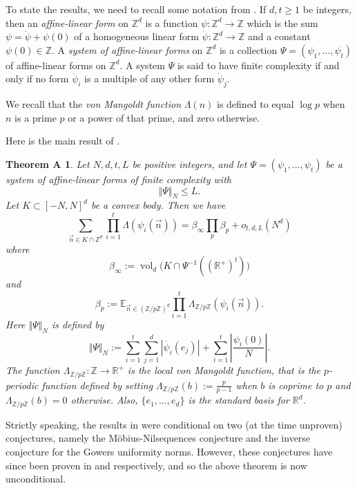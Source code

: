 \documentclass[11pt]{amsart}
\numberwithin{equation}{section}  %
\theoremstyle{remark}
\theoremstyle{plain}
\newtheorem*{gt-maintheorem}{Theorem A \cite[Main Theorem]{gt-linearprimes}}
\numberwithin{equation}{section}
\newcommand{\Z}{\mathbb{Z}}
\newcommand{\R}{\mathbb{R}}
\newcommand{\E}{\mathbb{E}}  %
\renewcommand{\leq}{\leqslant}
\renewcommand{\geq}{\geqslant}
\renewcommand{\(}{\left(}
\renewcommand{\)}{\right)}
\newcommand{\vect}[1]{{\ensuremath{\vec{#1}}}}
\newcommand{\vol}{\operatorname{vol}}
\begin{document}
To state the results, we need to recall some notation from \cite{gt-linearprimes}.  If $d,t \geq 1$ be integers, then an \emph{affine-linear form} on $\Z^d$ is a function $\psi: \Z^d \to \Z$ which is the sum $\psi = \dot \psi + \psi(0)$ of a homogeneous linear form $\dot \psi: \Z^d \to \Z$ and a constant $\psi(0) \in \Z$.  A \emph{system of affine-linear forms} on $\Z^d$ is a collection $\Psi = (\psi_1,\ldots,\psi_t)$ of affine-linear forms on $\Z^d$. 
A system $\Psi$ is said to have finite complexity if and only if no form $\dot\psi_i$ is a multiple of any other form $\dot\psi_j$. 


We recall that the \emph{von Mangoldt function} $\Lambda(n)$ is defined to equal $\log p$ when $n$ is a prime $p$ or a power of that prime, and zero otherwise.

Here is the main result of \cite{gt-linearprimes}.

\begin{gt-maintheorem}
  Let $N, d, t, L$ be positive integers, and let $\Psi = (\psi_1,\ldots,\psi_t)$ be a system of affine-linear forms of finite complexity with 
\begin{equation}\label{size-assumption}\Vert \Psi \Vert_N \leq L.  \end{equation}
Let $K \subset [-N,N]^d$ be a convex body.  Then we have
\begin{equation}\label{dickson-eq}
\sum_{ \vect{n} \in K \cap \Z^d} \prod_{i=1}^t \Lambda( \psi_i( \vect{n}) ) = \beta_\infty \prod_p \beta_p + o_{t,d,L}(N^d)
\end{equation}
where 
\[ \beta_{\infty} := \vol_d\big( K \cap \Psi^{-1}((\R^+)^t) \big)\]
and
\[ \beta_p := \E_{\vect{n} \in (\Z/p\Z)^d} \prod_{i=1}^t \Lambda_{\Z/p\Z}(\psi_i(\vect{n})).\]
Here $\Vert \Psi \Vert_N$ is defined by
\[ \Vert \Psi \Vert_N := \sum_{i=1}^t \sum_{j = 1}^d |\dot{\psi_i}(e_j)|  + \sum_{i = 1}^t \left|\frac{\psi_i(0)}{N}\right|.\]
The function $\Lambda_{\Z/p\Z}: \Z \to \R^+$ is the \emph{local von Mangoldt function}, that is the $p$-periodic function defined by setting $\Lambda_{\Z/p\Z}(b) := \frac{p}{p-1}$ when $b$ is coprime to $p$ and $\Lambda_{\Z/p\Z}(b) = 0$ otherwise.  Also, $\{e_1,\ldots,e_d\}$ is the standard basis for $\R^d$.
\end{gt-maintheorem}

Strictly speaking, the results in \cite{gt-linearprimes} were conditional on two (at the time unproven) conjectures, namely the M\"obius-Nilsequences conjecture and the inverse conjecture for the Gowers uniformity norms.  However, these conjectures have since been proven in \cite{gt-nilmobius} and \cite{GTZ} respectively, and so the above theorem is now unconditional.
\end{document}
